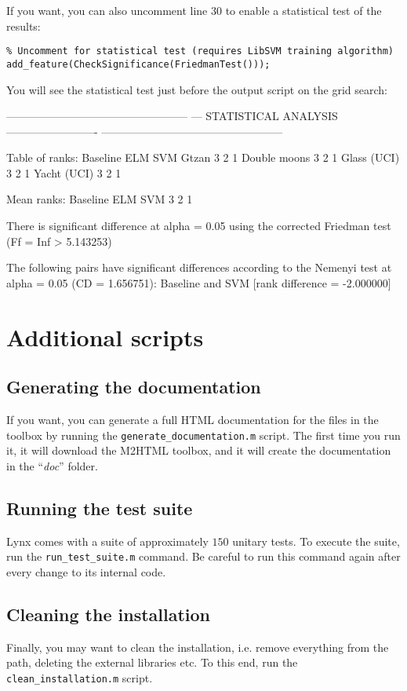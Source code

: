 If you want, you can also uncomment line 30 to enable a statistical test of the results:

\begin{lstlisting}
% Uncomment for statistical test (requires LibSVM training algorithm)
add_feature(CheckSignificance(FriedmanTest()));
\end{lstlisting}

\noindent You will see the statistical test just before the output script on the grid search:

\newpage

\begin{console}
--------------------------------------------------
--- STATISTICAL ANALYSIS -------------------------
--------------------------------------------------

Table of ranks:
              Baseline  ELM  SVM
Gtzan                3    2    1
Double moons         3    2    1
Glass (UCI)          3    2    1
Yacht (UCI)          3    2    1
 

Mean ranks:
  Baseline  ELM  SVM
         3    2    1
 
There is significant difference at alpha = 0.05 using the corrected 
   Friedman test (Ff = Inf > 5.143253)

The following pairs have significant differences according to the 
  Nemenyi test at alpha = 0.05 (CD = 1.656751):
	Baseline and SVM [rank difference = -2.000000]
\end{console}

\section{Additional scripts}

\subsection{Generating the documentation}

If you want, you can generate a full HTML documentation for the files in the toolbox by running the \verb|generate_documentation.m| script. The first time you run it, it will download the M2HTML toolbox, and it will create the documentation in the ``\textit{doc}'' folder.

\subsection{Running the test suite}

Lynx comes with a suite of approximately $150$ unitary tests. To execute the suite, run the \verb|run_test_suite.m| command. Be careful to run this command again after every change to its internal code.

\subsection{Cleaning the installation}

Finally, you may want to clean the installation, i.e. remove everything from the path, deleting the external libraries etc. To this end, run the \verb|clean_installation.m| script.